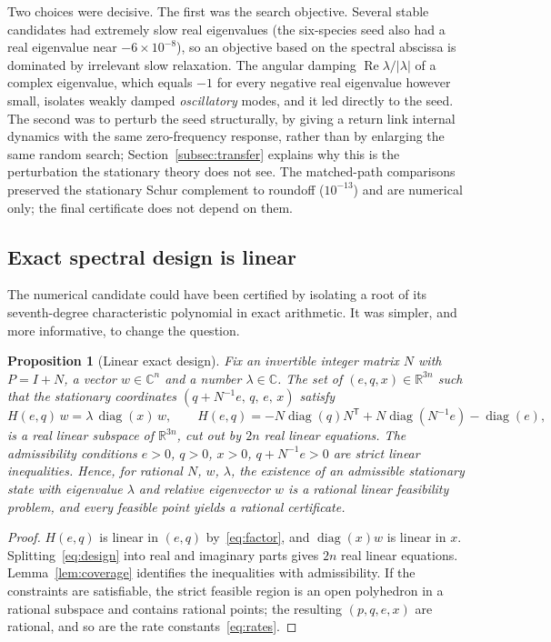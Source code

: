 \documentclass[11pt,a4paper]{article}
\theoremstyle{plain}
\newtheorem{proposition}[theorem]{Proposition}
\theoremstyle{definition}
\theoremstyle{remark}
\numberwithin{equation}{section}
\newcommand{\R}{\mathbb{R}}
\newcommand{\C}{\mathbb{C}}
\newcommand{\diag}{\operatorname{diag}}
\renewcommand{\Re}{\operatorname{Re}}
\begin{document}
Two choices were decisive. The first was the search objective. Several stable candidates had extremely slow real eigenvalues (the six-species seed also had a real eigenvalue near $-6\times10^{-8}$), so an objective based on the spectral abscissa is dominated by irrelevant slow relaxation. The angular damping $\Re\lambda/|\lambda|$ of a complex eigenvalue, which equals $-1$ for every negative real eigenvalue however small, isolates weakly damped \emph{oscillatory} modes, and it led directly to the seed. The second was to perturb the seed structurally, by giving a return link internal dynamics with the same zero-frequency response, rather than by enlarging the same random search; Section~\ref{subsec:transfer} explains why this is the perturbation the stationary theory does not see. The matched-path comparisons preserved the stationary Schur complement to roundoff ($10^{-13}$) and are numerical only; the final certificate does not depend on them.

\subsection{Exact spectral design is linear}\label{subsec:design}
The numerical candidate could have been certified by isolating a root of its seventh-degree characteristic polynomial in exact arithmetic. It was simpler, and more informative, to change the question.

\begin{proposition}[Linear exact design]\label{prop:linear}
Fix an invertible integer matrix $N$ with $P=I+N$, a vector $w\in\C^n$ and a number $\lambda\in\C$. The set of $(e,q,x)\in\R^{3n}$ such that the stationary coordinates $(q+N^{-1}e,\,q,\,e,\,x)$ satisfy
\begin{equation}\label{eq:design}
H(e,q)\,w=\lambda\,\diag(x)\,w,\qquad H(e,q)=-N\diag(q)N^{\mathsf T}+N\diag(N^{-1}e)-\diag(e),
\end{equation}
is a real linear subspace of $\R^{3n}$, cut out by $2n$ real linear equations. The admissibility conditions $e>0$, $q>0$, $x>0$, $q+N^{-1}e>0$ are strict linear inequalities. Hence, for rational $N$, $w$, $\lambda$, the existence of an admissible stationary state with eigenvalue $\lambda$ and relative eigenvector $w$ is a rational linear feasibility problem, and every feasible point yields a rational certificate.
\end{proposition}

\begin{proof}
$H(e,q)$ is linear in $(e,q)$ by~\eqref{eq:factor}, and $\diag(x)w$ is linear in $x$. Splitting~\eqref{eq:design} into real and imaginary parts gives $2n$ real linear equations. Lemma~\ref{lem:coverage} identifies the inequalities with admissibility. If the constraints are satisfiable, the strict feasible region is an open polyhedron in a rational subspace and contains rational points; the resulting $(p,q,e,x)$ are rational, and so are the rate constants~\eqref{eq:rates}.
\end{proof}
\end{document}
